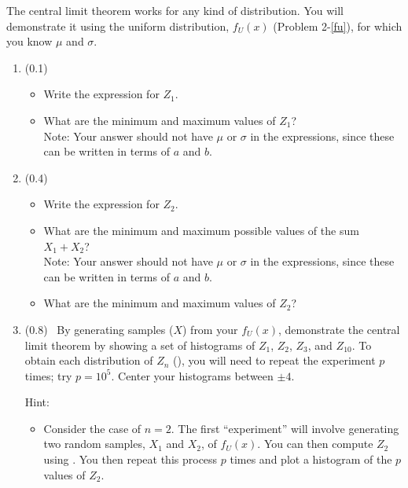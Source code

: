 \documentclass[11pt,titlepage,fleqn]{article}
\begin{document}
\begin{enumerate}
The central limit theorem works for any kind of distribution. You will demonstrate it using the uniform distribution, $f_U(x)$ (Problem 2-\ref{fu}), for which you know $\mu$ and $\sigma$.

\begin{enumerate}

\item (0.1)
\begin{itemize}
\item Write the expression for $Z_1$.
\item What are the minimum and maximum values of $Z_1$? \\
Note: Your answer should not have $\mu$ or $\sigma$ in the expressions, since these can be written in terms of $a$ and $b$.
\end{itemize}

\item (0.4)
\begin{itemize}
\item Write the expression for $Z_2$.
\item What are the minimum and maximum possible values of the sum $X_1 + X_2$? \\
Note: Your answer should not have $\mu$ or $\sigma$ in the expressions, since these can be written in terms of $a$ and $b$.
\item What are the minimum and maximum values of $Z_2$?
\end{itemize}

\item (0.8) \ptag\ By generating samples ($X$) from your $f_U(x)$, demonstrate the central limit theorem by showing a set of histograms of $Z_1$, $Z_2$, $Z_3$, and $Z_{10}$. To obtain each distribution of $Z_n$ (), you will need to repeat the experiment $p$ times; try $p = 10^5$. Center your histograms between $\pm 4$.

Hint:
\begin{itemize}
\item Consider the case of $n=2$. The first ``experiment'' will involve generating two random samples, $X_1$ and $X_2$, of $f_U(x)$. You can then compute $Z_2$ using . You then repeat this process $p$ times and plot a histogram of the $p$ values of $Z_2$.
\end{itemize}

\end{enumerate}

\end{enumerate}
\end{document}
